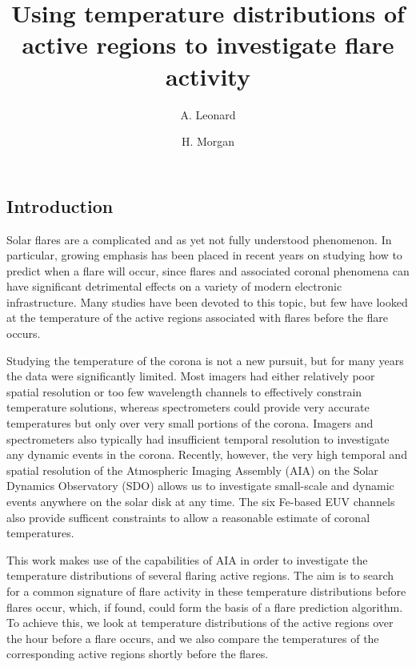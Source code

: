 \documentclass[referee,a4paper,12pt,traditabstract]{swsc}
\author{A. Leonard \and H. Morgan}
\institute{Institute of Mathematics, Physics and Computer Science, Aberystwyth University, Ceredigion, SY23 3BZ, Wales\\
					 \email{ajl7@aber.ac.uk}}
\title{Using temperature distributions of active regions to investigate flare activity}
\begin{document}
\begin{linenumbers}

\keywords{}

\maketitle

\section{Introduction}
Solar flares are a complicated and as yet not fully understood phenomenon.
In particular, growing emphasis has been placed in recent years on studying how to predict when a flare will occur, since flares and associated coronal phenomena can have significant detrimental effects on a variety of modern electronic infrastructure.
Many studies have been devoted to this topic, but few have looked at the temperature of the active regions associated with flares before the flare occurs.

Studying the temperature of the corona is not a new pursuit, but for many years the data were significantly limited.
Most imagers had either relatively poor spatial resolution or too few wavelength channels to effectively constrain temperature solutions, whereas spectrometers could provide very accurate temperatures but only over very small portions of the corona.
Imagers and spectrometers also typically had insufficient temporal resolution to investigate any dynamic events in the corona.
Recently, however, the very high temporal and spatial resolution of the Atmospheric Imaging Assembly (AIA) on the Solar Dynamics Observatory (SDO) allows us to investigate small-scale and dynamic events anywhere on the solar disk at any time.
The six Fe-based EUV channels also provide sufficent constraints to allow a reasonable estimate of coronal temperatures.

This work makes use of the capabilities of AIA in order to investigate the temperature distributions of several flaring active regions.
The aim is to search for a common signature of flare activity in these temperature distributions before flares occur, which, if found, could form the basis of a flare prediction algorithm.
To achieve this, we look at temperature distributions of the active regions over the hour before a flare occurs, and we also compare the temperatures of the corresponding active regions shortly before the flares.


\end{linenumbers}
\end{document}
